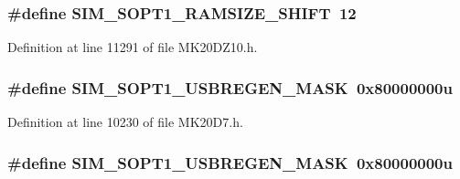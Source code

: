 \subsubsection[{\texorpdfstring{S\+I\+M\+\_\+\+S\+O\+P\+T1\+\_\+\+R\+A\+M\+S\+I\+Z\+E\+\_\+\+S\+H\+I\+FT}{SIM_SOPT1_RAMSIZE_SHIFT}}]{\setlength{\rightskip}{0pt plus 5cm}\#define S\+I\+M\+\_\+\+S\+O\+P\+T1\+\_\+\+R\+A\+M\+S\+I\+Z\+E\+\_\+\+S\+H\+I\+FT~12}\hypertarget{group___s_i_m___register___masks_ga4100f9e8e8ffc766ac1ac6493379b8dc}{}\label{group___s_i_m___register___masks_ga4100f9e8e8ffc766ac1ac6493379b8dc}


Definition at line 11291 of file M\+K20\+D\+Z10.\+h.

\subsubsection[{\texorpdfstring{S\+I\+M\+\_\+\+S\+O\+P\+T1\+\_\+\+U\+S\+B\+R\+E\+G\+E\+N\+\_\+\+M\+A\+SK}{SIM_SOPT1_USBREGEN_MASK}}]{\setlength{\rightskip}{0pt plus 5cm}\#define S\+I\+M\+\_\+\+S\+O\+P\+T1\+\_\+\+U\+S\+B\+R\+E\+G\+E\+N\+\_\+\+M\+A\+SK~0x80000000u}\hypertarget{group___s_i_m___register___masks_gac60c367119b3dcc752c4cf857b8a59b5}{}\label{group___s_i_m___register___masks_gac60c367119b3dcc752c4cf857b8a59b5}


Definition at line 10230 of file M\+K20\+D7.\+h.

\subsubsection[{\texorpdfstring{S\+I\+M\+\_\+\+S\+O\+P\+T1\+\_\+\+U\+S\+B\+R\+E\+G\+E\+N\+\_\+\+M\+A\+SK}{SIM_SOPT1_USBREGEN_MASK}}]{\setlength{\rightskip}{0pt plus 5cm}\#define S\+I\+M\+\_\+\+S\+O\+P\+T1\+\_\+\+U\+S\+B\+R\+E\+G\+E\+N\+\_\+\+M\+A\+SK~0x80000000u}\hypertarget{group___s_i_m___register___masks_gac60c367119b3dcc752c4cf857b8a59b5}{}\label{group___s_i_m___register___masks_gac60c367119b3dcc752c4cf857b8a59b5}


